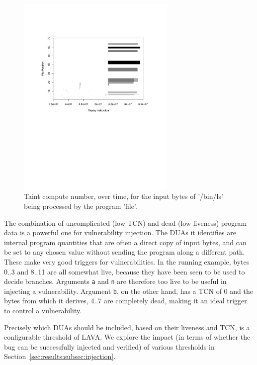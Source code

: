 \begin{figure} %
\includegraphics[width=3in]{tcn-graph.png}
\caption{Taint compute number, over time, for the input bytes of '/bin/ls' being processed by the program 'file'.}
\label{fig:tcn-graph}
\end{figure}


The combination of uncomplicated (low TCN) and dead (low liveness) program data is a powerful one for vulnerability injection.
The DUAs it identifies are internal program quantities that are often a direct copy of input bytes, and can be set to any chosen value without sending the program along a different path.  
These make very good triggers for vulnerabilities.
In the running example, bytes 0..3 and 8..11 are all somewhat live, because they have been seen to be used to decide branches.
Arguments \verb+a+ and \verb+n+ are therefore too live to be useful in injecting a vulnerability.
Argument \verb+b+, on the other hand, has a TCN of 0 and the bytes from which it derives, 4..7 are completely dead, 
making it an ideal trigger to control a vulnerability. 

Precisely which DUAs should be included, based on their liveness and TCN, is a configurable threshold of LAVA.
We explore the impact (in terms of whether the bug can be successfully injected and verified) of various thresholds in Section~\ref{sec:results:subsec:injection}.

